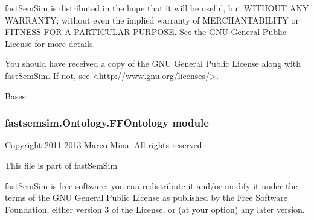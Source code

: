 \documentclass[letterpaper,10pt,english]{sphinxmanual}
\begin{document}
fastSemSim is distributed in the hope that it will be useful,
but WITHOUT ANY WARRANTY; without even the implied warranty of
MERCHANTABILITY or FITNESS FOR A PARTICULAR PURPOSE.  See the
GNU General Public License for more details.

You should have received a copy of the GNU General Public License
along with fastSemSim.  If not, see \textless{}\href{http://www.gnu.org/licenses/}{http://www.gnu.org/licenses/}\textgreater{}.

\begin{fulllineitems}
\label{fastsemsim.Ontology:fastsemsim.Ontology.DiseaseOntology.DiseaseOntology}
Bases: {\hyperref[fastsemsim.Ontology:fastsemsim.Ontology.Ontology.Ontology]{}}

\begin{fulllineitems}
\label{fastsemsim.Ontology:fastsemsim.Ontology.DiseaseOntology.DiseaseOntology.alt_ids}
\end{fulllineitems}


\begin{fulllineitems}
\label{fastsemsim.Ontology:fastsemsim.Ontology.DiseaseOntology.DiseaseOntology.obsolete_ids}
\end{fulllineitems}


\end{fulllineitems}



\subsubsection{fastsemsim.Ontology.FFOntology module}
\label{fastsemsim.Ontology:fastsemsim-ontology-ffontology-module}\label{fastsemsim.Ontology:module-fastsemsim.Ontology.FFOntology}
Copyright 2011-2013 Marco Mina. All rights reserved.

This file is part of fastSemSim

fastSemSim is free software: you can redistribute it and/or modify
it under the terms of the GNU General Public License as published by
the Free Software Foundation, either version 3 of the License, or
(at your option) any later version.
\end{document}
